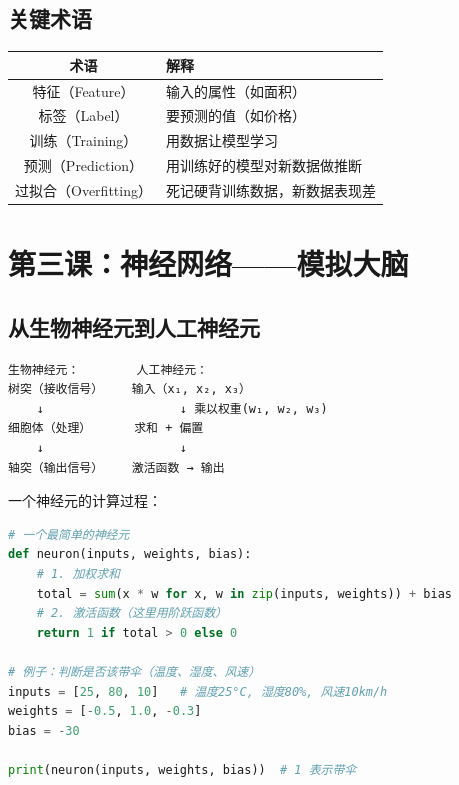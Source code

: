 \documentclass[a4paper,12pt]{ctexart}
\begin{document}
\subsection*{关键术语}

\begin{center}
\begin{tabular}{|c|l|}
\hline
\textbf{术语} & \textbf{解释} \\ \hline
特征（Feature） & 输入的属性（如面积） \\ \hline
标签（Label） & 要预测的值（如价格） \\ \hline
训练（Training） & 用数据让模型学习 \\ \hline
预测（Prediction） & 用训练好的模型对新数据做推断 \\ \hline
过拟合（Overfitting） & 死记硬背训练数据，新数据表现差 \\ \hline
\end{tabular}
\end{center}

\section*{第三课：神经网络——模拟大脑}

\subsection*{从生物神经元到人工神经元}

\begin{verbatim}
生物神经元：        人工神经元：
树突（接收信号）    输入（x₁, x₂, x₃）
    ↓                   ↓ 乘以权重(w₁, w₂, w₃)
细胞体（处理）      求和 + 偏置
    ↓                   ↓
轴突（输出信号）    激活函数 → 输出
\end{verbatim}

一个神经元的计算过程：

\begin{lstlisting}[language=Python]
# 一个最简单的神经元
def neuron(inputs, weights, bias):
    # 1. 加权求和
    total = sum(x * w for x, w in zip(inputs, weights)) + bias
    # 2. 激活函数（这里用阶跃函数）
    return 1 if total > 0 else 0

# 例子：判断是否该带伞（温度、湿度、风速）
inputs = [25, 80, 10]   # 温度25°C, 湿度80%, 风速10km/h
weights = [-0.5, 1.0, -0.3]
bias = -30

print(neuron(inputs, weights, bias))  # 1 表示带伞
\end{lstlisting}
\end{document}

